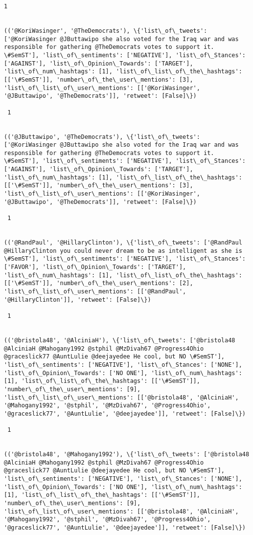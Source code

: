 \documentclass[11pt]{article}
\begin{document}
\begin{Verbatim}[commandchars=\\\{\}]
 1
 

(('@KoriWasinger', '@TheDemocrats'), \{'list\_of\_tweets': ['@KoriWasinger @JButtawipo she also voted for the Iraq war and was responsible for gathering @TheDemocrats votes to support it. \#SemST'], 'list\_of\_sentiments': ['NEGATIVE'], 'list\_of\_Stances': ['AGAINST'], 'list\_of\_Opinion\_Towards': ['TARGET'], 'list\_of\_num\_hashtags': [1], 'list\_of\_list\_of\_the\_hashtags': [['\#SemST']], 'number\_of\_the\_user\_mentions': [3], 'list\_of\_list\_of\_user\_mentions': [['@KoriWasinger', '@JButtawipo', '@TheDemocrats']], 'retweet': [False]\})

 1
 

(('@JButtawipo', '@TheDemocrats'), \{'list\_of\_tweets': ['@KoriWasinger @JButtawipo she also voted for the Iraq war and was responsible for gathering @TheDemocrats votes to support it. \#SemST'], 'list\_of\_sentiments': ['NEGATIVE'], 'list\_of\_Stances': ['AGAINST'], 'list\_of\_Opinion\_Towards': ['TARGET'], 'list\_of\_num\_hashtags': [1], 'list\_of\_list\_of\_the\_hashtags': [['\#SemST']], 'number\_of\_the\_user\_mentions': [3], 'list\_of\_list\_of\_user\_mentions': [['@KoriWasinger', '@JButtawipo', '@TheDemocrats']], 'retweet': [False]\})

 1
 

(('@RandPaul', '@HillaryClinton'), \{'list\_of\_tweets': ['@RandPaul @HillaryClinton you could never dream to be as intelligent as she is \#SemST'], 'list\_of\_sentiments': ['NEGATIVE'], 'list\_of\_Stances': ['FAVOR'], 'list\_of\_Opinion\_Towards': ['TARGET'], 'list\_of\_num\_hashtags': [1], 'list\_of\_list\_of\_the\_hashtags': [['\#SemST']], 'number\_of\_the\_user\_mentions': [2], 'list\_of\_list\_of\_user\_mentions': [['@RandPaul', '@HillaryClinton']], 'retweet': [False]\})

 1
 

(('@bristola48', '@AlciniaH'), \{'list\_of\_tweets': ['@bristola48 @AlciniaH @Mahogany1992 @stphil @MzDivah67 @Progress4Ohio @graceslick77 @AuntLulie @deejayedee He cool, but NO \#SemST'], 'list\_of\_sentiments': ['NEGATIVE'], 'list\_of\_Stances': ['NONE'], 'list\_of\_Opinion\_Towards': ['NO ONE'], 'list\_of\_num\_hashtags': [1], 'list\_of\_list\_of\_the\_hashtags': [['\#SemST']], 'number\_of\_the\_user\_mentions': [9], 'list\_of\_list\_of\_user\_mentions': [['@bristola48', '@AlciniaH', '@Mahogany1992', '@stphil', '@MzDivah67', '@Progress4Ohio', '@graceslick77', '@AuntLulie', '@deejayedee']], 'retweet': [False]\})

 1
 

(('@bristola48', '@Mahogany1992'), \{'list\_of\_tweets': ['@bristola48 @AlciniaH @Mahogany1992 @stphil @MzDivah67 @Progress4Ohio @graceslick77 @AuntLulie @deejayedee He cool, but NO \#SemST'], 'list\_of\_sentiments': ['NEGATIVE'], 'list\_of\_Stances': ['NONE'], 'list\_of\_Opinion\_Towards': ['NO ONE'], 'list\_of\_num\_hashtags': [1], 'list\_of\_list\_of\_the\_hashtags': [['\#SemST']], 'number\_of\_the\_user\_mentions': [9], 'list\_of\_list\_of\_user\_mentions': [['@bristola48', '@AlciniaH', '@Mahogany1992', '@stphil', '@MzDivah67', '@Progress4Ohio', '@graceslick77', '@AuntLulie', '@deejayedee']], 'retweet': [False]\})


\end{Verbatim}
\end{document}
